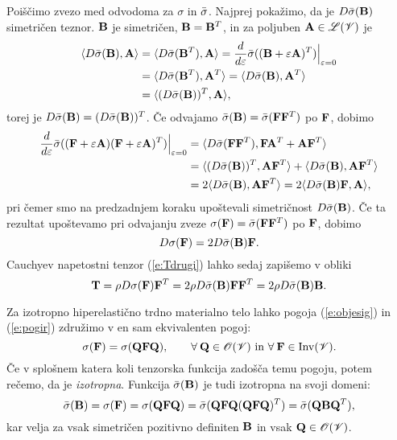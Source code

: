 Poiščimo zvezo med odvodoma za $\sigma$ in $\bar{\sigma}$. Najprej pokažimo, da je $D\bar{\sigma}(\mathbf B)$
simetričen teznor. $\mathbf B$ je simetričen, $\mathbf B=\mathbf B^{T}$, in
za poljuben $\mathbf A\in\mathscr L(\mathscr V)$ je
\begin{align*}
	\langle D\bar{\sigma}(\mathbf B),\mathbf A\rangle &=\langle D\bar{\sigma}(\mathbf B^T),\mathbf A\rangle=
	\frac{d}{d\varepsilon}\bar{\sigma}((\mathbf B+\varepsilon\mathbf A)^T)\Big|_{\varepsilon=0}\\
	&=\langle D\bar{\sigma}(\mathbf B^T),\mathbf A^T\rangle=\langle D\bar{\sigma}(\mathbf B),\mathbf A^T\rangle\\
	&=\langle(D\bar{\sigma}(\mathbf B))^T,\mathbf A\rangle,
\end{align*}
torej je $D\bar{\sigma}(\mathbf B)=(D\bar{\sigma}(\mathbf B))^T$. Če odvajamo $\bar{\sigma}(\mathbf B)=\bar{\sigma}(\mathbf F\mathbf F^T)$
po $\mathbf F$, dobimo
\begin{align*}
	\frac{d}{d\varepsilon}\bar{\sigma}((\mathbf F+\varepsilon\mathbf A)(\mathbf F+\varepsilon\mathbf A)^T)\Big|_{\varepsilon=0}&=
	\langle D\bar{\sigma}(\mathbf F\mathbf F^T),\mathbf F\mathbf A^T+\mathbf A\mathbf F^T\rangle\\
	&=\langle (D\bar{\sigma}(\mathbf B))^T,\mathbf A\mathbf F^T\rangle+\langle D\bar{\sigma}(\mathbf B),\mathbf A\mathbf F^T\rangle \\
	&=2\langle D\bar{\sigma}(\mathbf B),\mathbf A\mathbf F^T\rangle=2\langle D\bar{\sigma}(\mathbf B)\mathbf F,\mathbf A\rangle,
\end{align*}
pri čemer smo na predzadnjem koraku upoštevali simetričnost $D\bar{\sigma}(\mathbf B)$.
Če ta rezultat upoštevamo pri odvajanju zveze $\sigma(\mathbf F)=\bar{\sigma}(\mathbf F\mathbf F^T)$
po $\mathbf F$, dobimo
\begin{equation*}
	D\sigma(\mathbf F)=2D\bar{\sigma}(\mathbf B)\mathbf F.
\end{equation*}
Cauchyev napetostni tenzor (\ref{e:Tdrugi}) lahko sedaj zapišemo v obliki
\begin{equation} \label{e:tmalodrugace}
	\mathbf T=\rho D\sigma(\mathbf F)\mathbf F^T=2\rho D\bar{\sigma}(\mathbf B)\mathbf F\mathbf F^T=2\rho D\bar{\sigma}(\mathbf B)\mathbf B.
\end{equation}

Za izotropno hiperelastično trdno materialno telo lahko pogoja (\ref{e:objesig})
in (\ref{e:pogir}) združimo v en sam ekvivalenten pogoj:
\[
	\sigma(\mathbf F)=\sigma(\mathbf Q\mathbf F\mathbf Q),\qquad\forall\:\mathbf Q\in\mathscr{O}(\mathscr V)
	\ \textrm{in}\ \forall\:\mathbf F\in\mathrm{Inv}(\mathscr V).
\]
Če v splošnem katera koli tenzorska funkcija zadošča temu pogoju, potem rečemo,
da je \emph{izotropna}. Funkcija $\bar{\sigma}(\mathbf B)$ je tudi izotropna na svoji domeni:
\[
	\bar{\sigma}(\mathbf B)=\sigma(\mathbf F)=\sigma(\mathbf Q\mathbf F\mathbf Q)=
	\bar{\sigma}(\mathbf Q\mathbf F\mathbf Q(\mathbf Q\mathbf F\mathbf Q)^T)=\bar{\sigma}(\mathbf Q\mathbf B\mathbf Q^T),
\]
kar velja za vsak simetričen pozitivno definiten $\mathbf B$ in vsak $\mathbf Q\in\mathscr{O}(\mathscr V)$.

